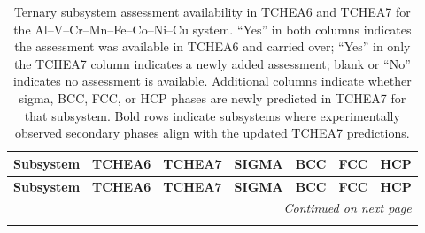 \documentclass[final,5p,times,twocolumn]{elsarticle}
\begin{document}
\onecolumn
\small
\begin{longtable}{lcccccc}
\caption{Ternary subsystem assessment availability in TCHEA6 and TCHEA7 for the Al--V--Cr--Mn--Fe--Co--Ni--Cu system. ``Yes'' in both columns indicates the assessment was available in TCHEA6 and carried over; ``Yes'' in only the TCHEA7 column indicates a newly added assessment; blank or ``No'' indicates no assessment is available. Additional columns indicate whether sigma, BCC, FCC, or HCP phases are newly predicted in TCHEA7 for that subsystem. Bold rows indicate subsystems where experimentally observed secondary phases align with the updated TCHEA7 predictions.}
\label{tab:tchea7_update} \\
 
\hline
\textbf{Subsystem} & \textbf{TCHEA6} & \textbf{TCHEA7} & \textbf{SIGMA} & \textbf{BCC} & \textbf{FCC} & \textbf{HCP} \\
\hline
\endfirsthead
 
\hline
\textbf{Subsystem} & \textbf{TCHEA6} & \textbf{TCHEA7} & \textbf{SIGMA} & \textbf{BCC} & \textbf{FCC} & \textbf{HCP} \\
\hline
\endhead
 
\hline
\multicolumn{7}{r}{\textit{Continued on next page}} \\
\endfoot
 
\hline
\endlastfoot
 

\end{longtable}
\end{document}

